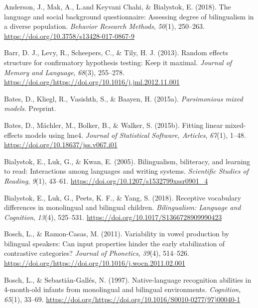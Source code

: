 \documentclass[english,,man,floatsintext]{apa6}
\begin{document}
\begingroup
\setlength{\parindent}{-0.5in}
\setlength{\leftskip}{0.5in}

\hypertarget{refs}{}
\leavevmode\hypertarget{ref-anderson_2018}{}%
Anderson, J., Mak, A., L.and Keyvani Chahi, \& Bialystok, E. (2018). The language and social background questionnaire: Assessing degree of bilingualism in a diverse population. \emph{Behavior Research Methods}, \emph{50}(1), 250--263. \url{https://doi.org/10.3758/s13428-017-0867-9}

\leavevmode\hypertarget{ref-barr_2013}{}%
Barr, D. J., Levy, R., Scheepers, C., \& Tily, H. J. (2013). Random effects structure for confirmatory hypothesis testing: Keep it maximal. \emph{Journal of Memory and Language}, \emph{68}(3), 255--278. \url{https://doi.org/https://doi.org/10.1016/j.jml.2012.11.001}

\leavevmode\hypertarget{ref-bates_2015a}{}%
Bates, D., Kliegl, R., Vasishth, S., \& Baayen, H. (2015a). \emph{Parsimonious mixed models}. Preprint.

\leavevmode\hypertarget{ref-bates_2015b}{}%
Bates, D., Mächler, M., Bolker, B., \& Walker, S. (2015b). Fitting linear mixed-effects models using lme4. \emph{Journal of Statistical Software, Articles}, \emph{67}(1), 1--48. \url{https://doi.org/10.18637/jss.v067.i01}

\leavevmode\hypertarget{ref-bialystok_2005}{}%
Bialystok, E., Luk, G., \& Kwan, E. (2005). Bilingualism, biliteracy, and learning to read: Interactions among languages and writing systems. \emph{Scientific Studies of Reading}, \emph{9}(1), 43--61. \url{https://doi.org/10.1207/s1532799xssr0901_4}

\leavevmode\hypertarget{ref-bialystok_2018}{}%
Bialystok, E., Luk, G., Peets, K. F., \& Yang, S. (2018). Receptive vocabulary differences in monolingual and bilingual children. \emph{Bilingualism: Language and Cognition}, \emph{13}(4), 525--531. \url{https://doi.org/10.1017/S1366728909990423}

\leavevmode\hypertarget{ref-bosch_2011}{}%
Bosch, L., \& Ramon-Casas, M. (2011). Variability in vowel production by bilingual speakers: Can input properties hinder the early stabilization of contrastive categories? \emph{Journal of Phonetics}, \emph{39}(4), 514--526. \url{https://doi.org/https://doi.org/10.1016/j.wocn.2011.02.001}

\leavevmode\hypertarget{ref-bosch_1997}{}%
Bosch, L., \& Sebastián-Gallés, N. (1997). Native-language recognition abilities in 4-month-old infants from monolingual and bilingual environments. \emph{Cognition}, \emph{65}(1), 33--69. \url{https://doi.org/https://doi.org/10.1016/S0010-0277(97)00040-1}
\end{document}
